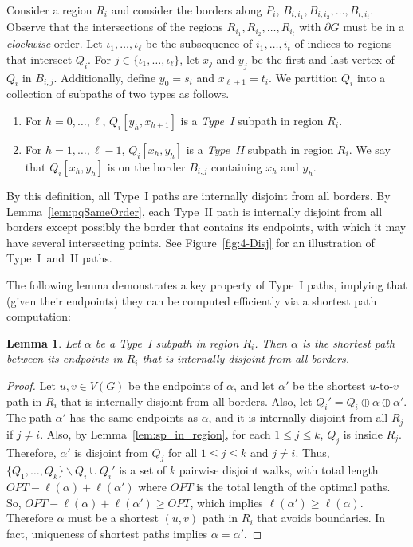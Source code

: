 \documentclass[11pt,twoside]{article}
\newtheorem{lemma}[theorem]{Lemma}
\newcommand{\OPT}{OPT}
\newcommand{\opt}[1]{Q_{#1}}
\newcommand{\region}[1]{R_{#1}}
\newcommand{\border}[2]{B_{#1,#2}}
\newcommand{\len}[1]{\ell(#1)}
\begin{document}
Consider a region $\region{i}$ and consider the borders along $P_i$, $\border{i}{i_1}, \border{i}{i_2}, \ldots, \border{i}{i_t}$.  Observe that the intersections of the regions $R_{i_1}, R_{i_2}, \ldots, R_{i_t}$ with $\partial G$ must be in a {\em clockwise} order.  Let $\iota_1, \ldots, \iota_\ell$ be the subsequence of $i_1, \ldots, i_t$ of indices to regions that intersect $\opt{i}$.  For $j \in \{\iota_1, \ldots, \iota_\ell\}$, let $x_j$ and $y_j$ be the first and last vertex of $\opt{i}$ in $\border{i}{j}$.  Additionally, define $y_0 = s_i$ and $x_{\ell+1} = t_i$. We partition $\opt{i}$ into a collection of subpaths of two types as follows.
\begin{enumerate}[Type~I :]
\item For $h = 0, \ldots, \ell$, $\opt{i}[y_h, x_{h+1}]$ is a {\em Type~I} subpath in region $\region{i}$.
\item For $h = 1,\ldots, \ell-1$, $\opt{i}[x_h, y_{h}]$ is a {\em Type~II} subpath in region $\region{i}$.  We say that $\opt{i}[x_h, y_{h}]$ is on the border $\border{i}{j}$ containing $x_h$ and $y_{h}$.
\end{enumerate}
By this definition, all Type~I paths are internally disjoint from all borders. By Lemma~\ref{lem:pqSameOrder}, each Type~II path is internally disjoint from all borders except possibly the border that contains its endpoints, with which it may have several intersecting points.  See Figure~\ref{fig:4-Disj} for an illustration of Type~I~and~II paths.

The following lemma demonstrates a key property of Type~I paths, implying that (given their endpoints) they can be computed efficiently via a shortest path computation:
\begin{lemma} 
\label{lem:alpha_opt}
Let $\alpha$ be a Type~I subpath in region $\region{i}$.  
Then $\alpha$ is the shortest path between its endpoints in $\region{i}$ that is internally disjoint from all borders.
\end{lemma}
\begin{proof}
Let $u,v\in V(G)$ be the endpoints of $\alpha$, and let $\alpha'$ be the shortest $u$-to-$v$ path in $\region{i}$ that is internally disjoint from all borders.
Also, let $\opt{i}' = \opt{i} \oplus \alpha \oplus \alpha'$.  
The path $\alpha'$ has the same endpoints as $\alpha$, and it is internally disjoint from all $\region{j}$ if $j \neq i$.
Also, by Lemma~\ref{lem:sp_in_region}, for each $1\leq j\leq k$, $\opt{j}$ is inside $\region{j}$.
Therefore, $\alpha'$ is disjoint from $\opt{j}$ for all $1\leq j\leq k$ and $j\neq i$.
Thus, $\{\opt{1}, \ldots, \opt{k}\}\backslash \opt{i} \cup \opt{i}'$ is a set of $k$ pairwise disjoint walks, with total length $\OPT - \len{\alpha} + \len{\alpha'}$ where $\OPT$ is the total length of the optimal paths.
So, $\OPT - \len{\alpha} + \len{\alpha'} \geq \OPT$, which implies $\len{\alpha'}  \geq \len{\alpha}$.
Therefore $\alpha$ must be a shortest $(u,v)$ path in $\region{i}$ that avoids boundaries.  In fact, uniqueness of shortest paths implies $\alpha = \alpha'$.
\end{proof}
\end{document}
